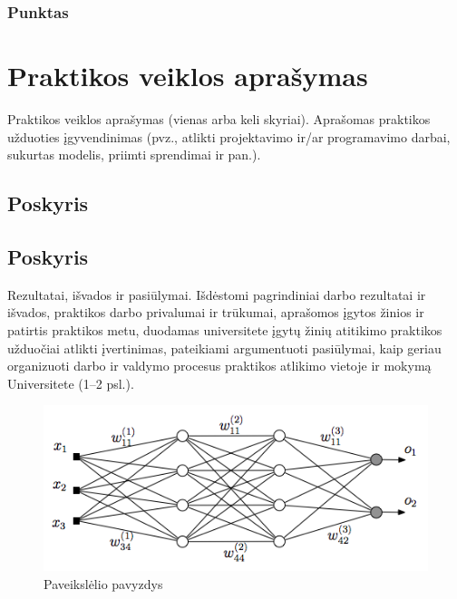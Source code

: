 \documentclass{VUMIFPSBakPrakAt}
\begin{document}
\subsubsection{Punktas}

\section{Praktikos veiklos aprašymas}
Praktikos veiklos aprašymas (vienas arba keli skyriai). Aprašomas praktikos užduoties
įgyvendinimas (pvz., atlikti projektavimo ir/ar programavimo darbai, sukurtas modelis, priimti
sprendimai ir pan.).

\subsection{Poskyris}
\subsection{Poskyris}

Rezultatai, išvados ir pasiūlymai. Išdėstomi pagrindiniai darbo rezultatai ir išvados, praktikos
darbo privalumai ir trūkumai, aprašomos įgytos žinios ir patirtis praktikos metu, duodamas
universitete įgytų žinių atitikimo praktikos užduočiai atlikti įvertinimas, pateikiami argumentuoti
pasiūlymai, kaip geriau organizuoti darbo ir valdymo procesus praktikos atlikimo vietoje ir
mokymą Universitete (1--2 psl.).

\printbibliography[heading=bibintoc]


\begin{figure}[H]
    \centering
    \includegraphics[scale=0.5]{img/MLP}
    \caption{Paveikslėlio pavyzdys}
    \label{img:mlp}
\end{figure}
\end{document}
